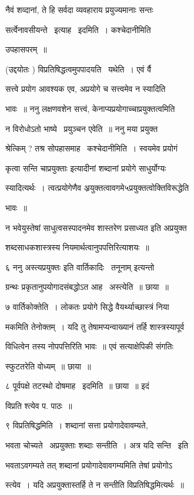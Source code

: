 \documentclass[11pt, openany]{book}
\begin{document}
नैवं शव्दानां, ते हि सर्वदा व्यवहाराय प्रयुज्यमानाः सन्तः 

सर्त्वेनावसीयन्ते \textendash\ इत्याह \textendash\ इदमिति~। कश्चेदानीमिति 

उपहासपरम्~॥ 

(उद्दयोतः ) विप्रतिषिद्धत्वमुपपादयति \textendash\ यथेति~। एवं र्वै 

सत्त्वे प्रयोग आवश्यक एव, अप्रयोगे च सत्त्वमेव न स्यादिति 

भावः~॥ ननु लक्षणवशेन सत्त्वं, केनाप्यप्रयोगाच्चाप्रयुक्तत्वमिति 

न विरोधोऽतो भाष्ये \textendash\ प्रयुञ्चन एवेति~॥ ननु मया प्रयुक्त \textendash\ 

श्रेत्किम् ? तश्र सोपहासमाह \textendash\ कश्चेदानीमिति~। स्वयमेव प्रयोगं 

कृत्वा {\qt सन्ति चाप्रयुक्ताः} इत्यादीनां शब्दानां प्रयोगे साधुर्योग्यः 

स्यादित्यर्थः~। त्वत्प्रयोगेणैव
अ्रयुक्तत्वावगमे५प्रयुक्तत्वोक्तिविरूद्धेति 

भावः~॥ 



न भवेयुस्तेषां साधुत्वसस्पादनमेव शास्तरेण प्रसाध्यत इति अप्रयुक्त \textendash\ 

शब्दसाधकशास्त्रस्य नियमार्थत्वानुपपत्तिरित्याशयः~॥ 

६ ननु {\qt अस्त्यप्रयुक्तः} इति वार्तिकादिः \textendash\ {\qt तनूनाम्} इत्यन्तो 

ग्रन्थः प्रकृतानुपयोगादसंबद्धोऽत आह \textendash\ अस्त्येति~॥ छाया~॥ 

७ वार्तिकोक्तेति~। लोकतः प्रयोगे सिद्धे वैयर्थ्याच्छास्त्रं निया \textendash\ 

मकमिति तेनोक्तम्~। यदि तु तेषामप्यन्वाख्यानं तर्हि शास्त्रस्यापूर्व \textendash\ 

विधित्वेन तस्य नोपपत्तिरिति भावः~॥ एवं सत्याक्षेपिकी संगतिः 

स्फुटतरेति वोध्यम्~॥ छाया~॥ 

८ पूर्वपक्षे तटस्थो दोषमाह \textendash\ इदमिति~॥ छाया~॥ इदं 

विप्रति श्त्येव प. पाठः~॥ 

९ विप्रतिषिद्धमिति~। शब्दानां सत्ता प्रयोगादेवावम्यते, 

भवता चोच्यते \textendash\ अप्रयुक्ताः शब्दाः सन्तीति~। अत्र यदि सन्ति \textendash\ इति 

भवताऽवगम्यते तत् शब्दानां प्रयोगादेवावगम्यमिति तेषां प्रयोगोऽ \textendash\ 

स्त्येव~। यदि अप्रयुक्तास्तर्हि ते न सन्तीति विप्रतिषिद्धमित्यर्थः~॥ 
\end{document}
